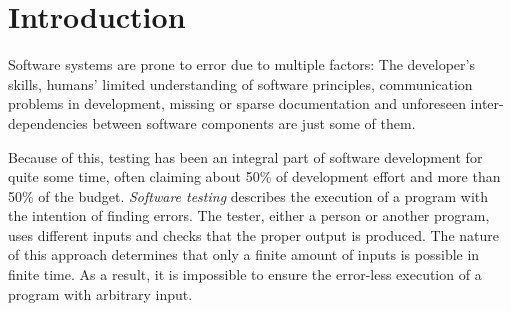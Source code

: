 \chapter{Introduction}
Software systems are prone to error due to multiple factors: The developer's skills, humans' limited understanding of software principles, communication problems in development, missing or sparse documentation and unforeseen inter-dependencies between software components are just some of them.

Because of this, testing has been an integral part of software development for quite some time, often claiming about 50\% of development effort and more than 50\% of the budget.\cite{Myers2011}
\emph{Software testing} describes the execution of a program with the intention of finding errors.
The tester, either a person or another program, uses different inputs and checks that the proper output is produced.
The nature of this approach determines that only a finite amount of inputs is possible in finite time.
As a result, it is impossible to ensure the error-less execution of a program with arbitrary input.


